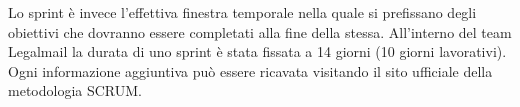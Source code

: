 Lo sprint è invece l'effettiva finestra temporale nella quale si prefissano degli obiettivi che dovranno essere completati alla fine della stessa. All'interno del team Legalmail la durata di uno sprint è stata fissata a 14 giorni (10 giorni lavorativi). \\
Ogni informazione aggiuntiva può essere ricavata visitando il sito ufficiale della metodologia SCRUM. %
\begin{comment}
\subsection{Smart Working}
Essendo Infocert un'azienda distribuita in più sedi sul territorio italiano, è molto probabile che i componenti di un team non lavorino nello stesso ufficio fisico, all'interno del team Legalmail infatti quattro componenti erano distribuiti tra le sedi di Milano e Roma. \\
Questa particolare caratteristica però non può influire con l'agilità del processo lavorativo, l'azienda ha quindi predisposto un sistema per gestire al meglio le comunicazioni virtuali: per organizzare le riunioni con i componenti da remoto (come ad esempio il Daily SCRUM) ogni team deve prenotare una stanza virtuale alla quale è possibile collegarsi tramite le opportune autorizzazioni e, di conseguenza, rendere agevoli gli incontri virtuali.\\
Per garantire l'agilità di questo processo all'interno degli uffici sono presenti stanze fisiche predisposte per le riunioni virtuali: telecamere grandangolari, schermi molto grandi e microfoni d'ambiente. \\
Questa particolare predisposizione al lavoro remoto ha innescato il fenomeno dello smart working: tutti i dipendenti aziendali hanno diritto ad un giorno alla settimana per poter lavorare da casa, in modo da garantire un adeguato bilanciamento tra vita personale e professionale. \\
È bene precisare che, per quanto flessibile, lo smart working è una pratica ben organizzata, i giorni disponibili sono infatti fissati e gestiti in modo da garantire la presenza della maggior parte del team in ufficio. 
\end{comment}
